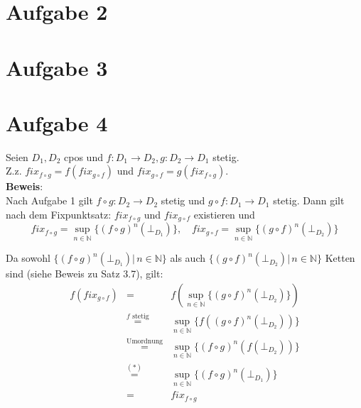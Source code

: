 \documentclass[11pt,a4paper,ngerman]{article}
\begin{document}
\section*{Aufgabe 2}



\section*{Aufgabe 3}



\section*{Aufgabe 4}
Seien $D_1, D_2$ cpos und $f: D_1 \to D_2, g: D_2 \to D_1$ stetig.\\
Z.z. $fix_{f\circ g} = f(fix_{g\circ f})$ und $fix_{g\circ f} = g(fix_{f\circ g})$.\\

\textbf{Beweis}:\\
Nach Aufgabe 1 gilt $f \circ g : D_2 \to D_2$ stetig und $g \circ f : D_1 \to D_1$ stetig. Dann gilt nach dem Fixpunktsatz: $fix_{f \circ g}$ und $fix_{g \circ f}$ existieren und
$$fix_{f \circ g} = \sup_{n \in \mathbb{N}} \{(f \circ g)^n(\bot_{D_1}) \}, \quad fix_{g \circ f} = \sup_{n \in \mathbb{N}} \{(g \circ f)^n(\bot_{D_2}) \}$$

Da sowohl $\{(f \circ g)^n(\bot_{D_1}) |\, n\in \mathbb{N}\}$ als auch $\{(g \circ f)^n(\bot_{D_2}) |\, n\in \mathbb{N}\}$ Ketten sind (siehe Beweis zu Satz 3.7), gilt:\\

\begin{eqnarray*}
f (fix_{g \circ f}) &=& f(\sup_{n \in \mathbb{N}} \{(g \circ f)^n(\bot_{D_2}) \}) \\
&\stackrel{f \text{ stetig}}{=}& \sup_{n \in \mathbb{N}} \{f((g \circ f)^n(\bot_{D_2})) \}\\
&\stackrel{\text{Umordnung}}{=}& \sup_{n \in \mathbb{N}} \{(f \circ g)^n(f(\bot_{D_2})) \}\\
&\stackrel{(*)}{=}& \sup_{n \in \mathbb{N}} \{(f \circ g)^n(\bot_{D_1}) \}\\
&=& fix_{f\circ g}
\end{eqnarray*}



\label{LastPage}
\end{document}
